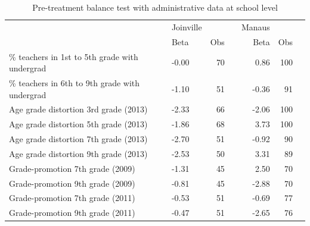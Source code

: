 \documentclass[
	article,			%
	12pt,				%
	oneside,			%
	a4paper,			%
	]{article}
\begin{document}


\begin{table}[htbp]
  \centering
\fontsize{9}{11}\selectfont
 \begin{threeparttable}
  \caption{Pre-treatment balance test with administrative data at school level}
\begin{tabular}{p{27em}lrrrrr}
\hline
\hline
           &  Joinville &            &            &     Manaus &            \\

           &       Beta &        Obs &            &       Beta &        Obs \\
\hline
\% teachers in 1st to 5th grade with undergrad &      -0.00 &         70 &            &       0.86 &        100 \\

\% teachers in 6th to 9th grade with undergrad &      -1.10 &         51 &            &      -0.36 &         91 \\

Age grade distortion 3rd grade (2013) &      -2.33 &         66 &            &    -2.06 &        100 \\

Age grade distortion 5th grade (2013) &     -1.86 &         68 &            &       3.73 &        100 \\

Age grade distortion 7th grade (2013) &      -2.70 &         51 &            &      -0.92 &         90 \\

Age grade distortion 9th grade (2013) &      -2.53 &         50 &            &       3.31 &         89 \\

Grade-promotion 7th grade (2009) &      -1.31 &         45 &            &       2.50 &         70 \\

Grade-promotion 9th grade (2009) &      -0.81 &         45 &            &    -2.88 &         70 \\

Grade-promotion 7th grade (2011) &      -0.53 &         51 &            &      -0.69 &         77 \\

Grade-promotion 9th grade (2011) &      -0.47 &         51 &            &      -2.65 &         76 \\


\end{tabular}
\end{threeparttable}
\end{table}
\end{document}
